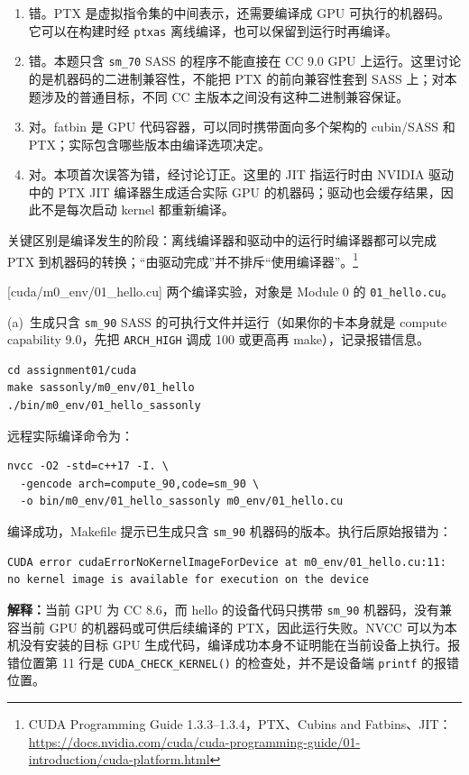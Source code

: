 \documentclass[11pt,a4paper,fontset=none]{ctexart}
\begin{document}
\begin{tcolorbox}[title={8.1 作答（讨论后整理）},breakable]
\begin{enumerate}[label=(\alph*)]
  \item 错。PTX 是虚拟指令集的中间表示，还需要编译成 GPU 可执行的机器码。它可以在构建时经 \texttt{ptxas} 离线编译，也可以保留到运行时再编译。
  \item 错。本题只含 \texttt{sm\_70} SASS 的程序不能直接在 CC 9.0 GPU 上运行。这里讨论的是机器码的二进制兼容性，不能把 PTX 的前向兼容性套到 SASS 上；对本题涉及的普通目标，不同 CC 主版本之间没有这种二进制兼容保证。
  \item 对。fatbin 是 GPU 代码容器，可以同时携带面向多个架构的 cubin/SASS 和 PTX；实际包含哪些版本由编译选项决定。
  \item 对。本项首次误答为错，经讨论订正。这里的 JIT 指运行时由 NVIDIA 驱动中的 PTX JIT 编译器生成适合实际 GPU 的机器码；驱动也会缓存结果，因此不是每次启动 kernel 都重新编译。
\end{enumerate}
关键区别是编译发生的阶段：离线编译器和驱动中的运行时编译器都可以完成 PTX 到机器码的转换；“由驱动完成”并不排斥“使用编译器”。\footnote{CUDA Programming Guide 1.3.3--1.3.4，PTX、Cubins and Fatbins、JIT：\url{https://docs.nvidia.com/cuda/cuda-programming-guide/01-introduction/cuda-platform.html}}
\end{tcolorbox}

[cuda/m0\_env/01\_hello.cu]
两个编译实验，对象是 Module 0 的 \texttt{01\_hello.cu}。

(a)~生成只含 \texttt{sm\_90} SASS 的可执行文件并运行（如果你的卡本身就是 compute capability 9.0，先把 \texttt{ARCH\_HIGH} 调成 100 或更高再 make），记录报错信息。

\begin{lstlisting}
cd assignment01/cuda
make sassonly/m0_env/01_hello
./bin/m0_env/01_hello_sassonly
\end{lstlisting}

\begin{tcolorbox}[title={8.2(a) 实验记录：只含高架构机器码},breakable]
远程实际编译命令为：
\begin{lstlisting}
nvcc -O2 -std=c++17 -I. \
  -gencode arch=compute_90,code=sm_90 \
  -o bin/m0_env/01_hello_sassonly m0_env/01_hello.cu
\end{lstlisting}
编译成功，Makefile 提示已生成只含 \texttt{sm\_90} 机器码的版本。执行后原始报错为：
\begin{lstlisting}
CUDA error cudaErrorNoKernelImageForDevice at m0_env/01_hello.cu:11: no kernel image is available for execution on the device
\end{lstlisting}
\textbf{解释：}当前 GPU 为 CC 8.6，而 hello 的设备代码只携带 \texttt{sm\_90} 机器码，没有兼容当前 GPU 的机器码或可供后续编译的 PTX，因此运行失败。NVCC 可以为本机没有安装的目标 GPU 生成代码，编译成功本身不证明能在当前设备上执行。报错位置第 11 行是 \texttt{CUDA\_CHECK\_KERNEL()} 的检查处，并不是设备端 \texttt{printf} 的报错位置。
\end{tcolorbox}
\end{document}
